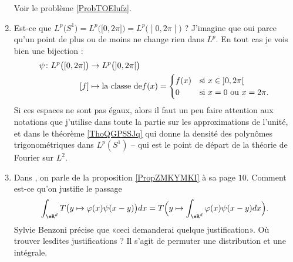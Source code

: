 \begin{enumerate}
            Voir le problème \ref{ProbTOElufz}.

    \item
        Est-ce que \( L^p\big( S^1 \big)=L^p\big( \mathopen[ 0 , 2\pi \mathclose] \big)=L^p\big( \mathopen] 0 , 2\pi \mathclose[ \big)\) ? J'imagine que oui parce qu'un point de plus ou de moins ne change rien dans \( L^p\). En tout cas je vois bien une bijection :
            \begin{equation}
                \begin{aligned}
                    \psi\colon L^p\big( \mathopen[ 0 , 2\pi \mathclose] \big)&\to L^p\big( \mathopen] 0 , 2\pi \mathclose[ \big) \\
                        [f]&\mapsto \text{la classe de} f(x)=\begin{cases}
                            f(x)    &   \text{si \( x\in\mathopen] 0 , 2\pi \mathclose[\)}\\
                            0    &    \text{si \( x=0\) ou \( x=2\pi\)}.
                        \end{cases}
                \end{aligned}
            \end{equation}
            Si ces espaces ne sont pas égaux, alors il faut un peu faire attention aux notations que j'utilise dans toute la partie sur les approximations de l'unité, et dans le théorème \ref{ThoQGPSSJq} qui donne la densité des polynômes trigonométriques dans \( L^p(S^1)\) -- qui est le point de départ de la théorie de Fourier sur \( L^2\). 


        \item 
            Dans \cite{OEVAuEz}, on parle de la proposition \ref{PropZMKYMKI} à sa page \( 10\). Comment est-ce qu'on justifie le passage
            \begin{equation}
                \int_{\eR^d}T\big( y\mapsto \varphi(x)\psi(x-y) \big)dx=T\Big( y\mapsto\int_{\eR^d}\varphi(x)\psi(x-y)dx \Big).
            \end{equation}
            Sylvie Benzoni précise que «ceci demanderai quelque justification». Où trouver lesdites justifications ? Il s'agit de permuter une distribution et une intégrale.


\end{enumerate}

